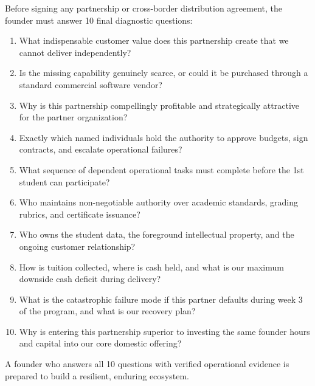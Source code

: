 Before signing any partnership or cross-border distribution agreement, the founder must answer 10 final diagnostic questions:
\begin{enumerate}
\item What indispensable customer value does this partnership create that we cannot deliver independently?
\item Is the missing capability genuinely scarce, or could it be purchased through a standard commercial software vendor?
\item Why is this partnership compellingly profitable and strategically attractive for the partner organization?
\item Exactly which named individuals hold the authority to approve budgets, sign contracts, and escalate operational failures?
\item What sequence of dependent operational tasks must complete before the 1st student can participate?
\item Who maintains non-negotiable authority over academic standards, grading rubrics, and certificate issuance?
\item Who owns the student data, the foreground intellectual property, and the ongoing customer relationship?
\item How is tuition collected, where is cash held, and what is our maximum downside cash deficit during delivery?
\item What is the catastrophic failure mode if this partner defaults during week 3 of the program, and what is our recovery plan?
\item Why is entering this partnership superior to investing the same founder hours and capital into our core domestic offering?
\end{enumerate}
A founder who answers all 10 questions with verified operational evidence is prepared to build a resilient, enduring ecosystem.
